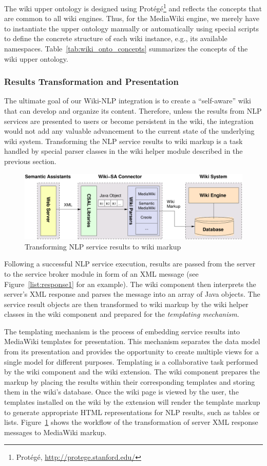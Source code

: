 The wiki upper ontology is designed using Prot\'{e}g\'{e}\footnote{Prot\'{e}g\'{e}, \url{http://protege.stanford.edu/}} and reflects the concepts that are common to all wiki engines. Thus, for the MediaWiki engine, we merely have to instantiate the upper ontology manually or automatically using special scripts to define the concrete structure of each wiki instance, e.g., its available namespaces. Table~\ref{tab:wiki_onto_concepts} summarizes the concepts of the wiki upper ontology.

\subsubsection{Results Transformation and Presentation}
The ultimate goal of our Wiki-NLP integration is to create a ``self-aware'' wiki that can develop and organize its content. Therefore, unless the results from NLP services are presented to users or become persistent in the wiki, the integration would not add any valuable advancement to the current state of the underlying wiki system. Transforming the NLP service results to wiki markup is a task handled by special parser classes in the wiki helper module described in the previous section.

\begin{figure}[h!]
\centering
\includegraphics[width=0.7\columnwidth]{pictures/result_transform.pdf}
\caption{Transforming NLP service results to wiki markup}
\label{fig:result_transform}
\end{figure}

Following a successful NLP service execution, results are passed from the \sa server to the service broker module in form of an XML message (see Figure~\ref{list:response1} for an example). The wiki component then interprets the server's XML response and parses the message into an array of Java objects. The service result objects are then transformed to wiki markup by the wiki helper classes in the wiki component and prepared for the \emph{templating mechanism}. 

The templating mechanism is the process of embedding service results into MediaWiki templates for presentation. This mechanism separates the data model from its presentation and provides the opportunity to create multiple views for a single model for different purposes. Templating is a collaborative task performed by the wiki component and the wiki extension. The wiki component prepares the markup by placing the results within their corresponding templates and storing them in the wiki's database. Once the wiki page is viewed by the user, the templates installed on the wiki by the \sa extension will render the template markup to generate appropriate HTML representations for NLP results, such as tables or lists. Figure~\ref{fig:result_transform} shows the workflow of the transformation of server XML response messages to MediaWiki markup.

